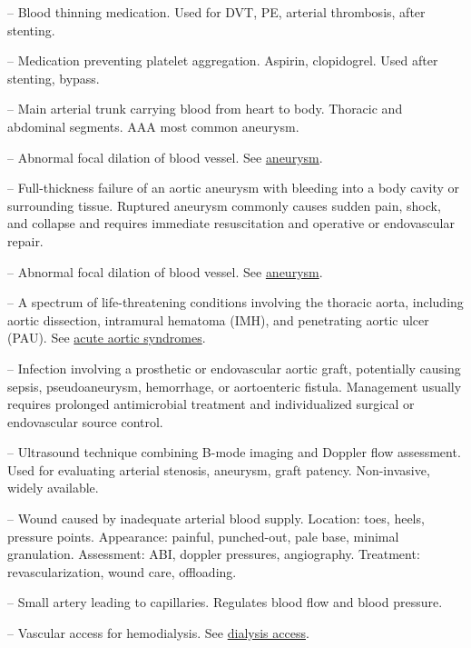 -- Blood thinning medication. Used for DVT, PE, arterial thrombosis, after stenting.

-- Medication preventing platelet aggregation. Aspirin, clopidogrel. Used after stenting, bypass.

-- Main arterial trunk carrying blood from heart to body. Thoracic and abdominal segments. AAA most common aneurysm.

-- Abnormal focal dilation of blood vessel. See \hyperlink{Aneurysm}{aneurysm}.

-- Full-thickness failure of an aortic aneurysm with bleeding into a body cavity or surrounding tissue. Ruptured aneurysm commonly causes sudden pain, shock, and collapse and requires immediate resuscitation and operative or endovascular repair.

-- Abnormal focal dilation of blood vessel. See \hyperlink{Aneurysm}{aneurysm}.

-- A spectrum of life-threatening conditions involving the thoracic aorta, including aortic dissection, intramural hematoma (IMH), and penetrating aortic ulcer (PAU). See \hyperlink{Acute Aortic Syndromes}{acute aortic syndromes}.

-- Infection involving a prosthetic or endovascular aortic graft, potentially causing sepsis, pseudoaneurysm, hemorrhage, or aortoenteric fistula. Management usually requires prolonged antimicrobial treatment and individualized surgical or endovascular source control.

-- Ultrasound technique combining B-mode imaging and Doppler flow assessment. Used for evaluating arterial stenosis, aneurysm, graft patency. Non-invasive, widely available.

-- Wound caused by inadequate arterial blood supply. Location: toes, heels, pressure points. Appearance: painful, punched-out, pale base, minimal granulation. Assessment: ABI, doppler pressures, angiography. Treatment: revascularization, wound care, offloading.

-- Small artery leading to capillaries. Regulates blood flow and blood pressure.

-- Vascular access for hemodialysis. See \hyperlink{Dialysis Access}{dialysis access}.

